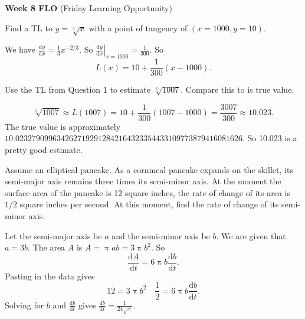 \documentclass[12pt,fleqn,answers]{exam}
\begin{document}
\vspace{0.1in}

\noindent \textbf{Week 8 FLO} (Friday Learning Opportunity) 

\begin{questions}  
    
  \question Find a TL to $y = \sqrt[3]{x}$ with a point of tangency of
  $(x=1000, y = 10)$. 
  
  \begin{solution}%
  We have $\displaystyle \frac{\mathrm{d} y}{\mathrm{d} x} = \frac{1}{3} x^{-2/3}$. So
  $ \left. \displaystyle \frac{\mathrm{d} y}{\mathrm{d} x}  \right \vert_{x=1000} = \frac{1}{300}$. So 
\[
   L(x) = 10 + \frac{1}{300} (x-1000).
\]

    
  \end{solution}

  \question Use the TL from Question 1 to estimate $\sqrt[3]{1007}$. Compare this to is 
  true value.

  \begin{solution}%
\[
    \sqrt[3]{1007} \approx L(1007) = 10 + \frac{1}{300} (1007-1000) = \frac{3007}{300} \approx 10.023.
\]
The true value is approximately $10.0232790996342627192912842164323354433109773879416081626$. So 10.023
is a pretty good estimate.
    
  \end{solution}

 

  \question Assume an elliptical pancake.  As a cornmeal pancake expands on the skillet,
  its semi-major axis remains three times its semi-minor axis.  At the moment the surface 
  area of the pancake is 12 square inches, the rate of change of its area is $1/2$ 
  square inches per second.  At this moment, find the rate of change of its semi-minor
  axis.

  \begin{solution}[3.5in] Let the semi-major axis be $a$ and the semi-minor axis be $b$. We are
  given that $a = 3 b$.  The area $A$ is $A = \uppi a b = 3 \uppi b^2$. So
  \begin{equation}
    \frac{\mathrm{d} A}{\mathrm{d} t} = 6 \uppi b  \frac{\mathrm{d} b}{\mathrm{d} t}.
  \end{equation}
  Pasting in the data gives
   \begin{equation}
   12 = 3 \uppi b^2   \quad  \frac{1}{2}  = 6 \uppi b  \frac{\mathrm{d} b}{\mathrm{d} t}.
  \end{equation}
  Solving for $b$ and $\frac{\mathrm{d} b}{\mathrm{d} t}$ gives $ \frac{\mathrm{d} b}{\mathrm{d} t} =
  \frac{1}{24 \sqrt{\ensuremath{\pi} }}$.
  \end{solution}



\end{questions}
\end{document}
